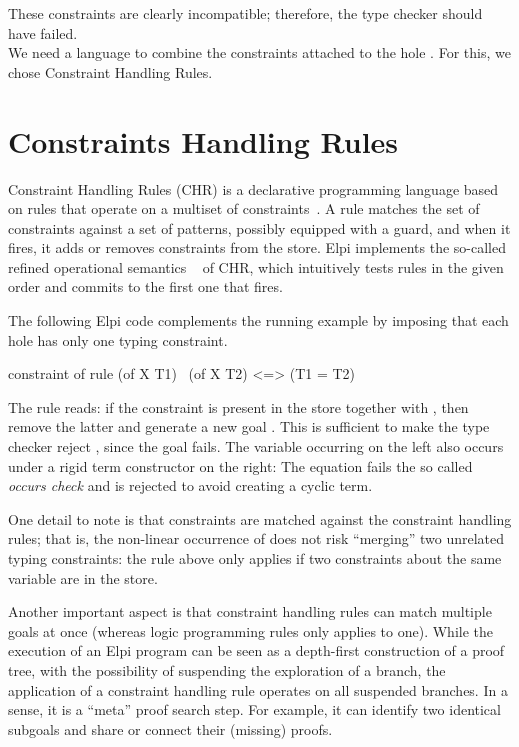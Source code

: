 \documentclass[a4paper, 11pt]{book}
\begin{document}
These constraints are clearly incompatible; therefore, the type checker
should have failed.
~\\

We need a language to combine the constraints attached to the hole
. For this, we chose Constraint Handling Rules.

\section{Constraints Handling Rules}\label{sec:chrui}


Constraint Handling Rules (CHR) is a declarative programming language based
on rules that operate on a multiset of constraints~\cite{chr}. A rule matches
the set of constraints against a set of patterns, possibly equipped with a
guard, and when it fires, it adds or removes constraints from the store.
Elpi implements the so-called refined operational semantics
~\cite{10.1007/978-3-540-27775-0_7} of CHR, which intuitively tests rules in
the given order and commits to the first one that fires.

The following Elpi code complements the running example by imposing that each
hole has only one typing constraint.

\begin{elpicode}
constraint of {
  rule (of X T1) \ (of X T2) <=> (T1 = T2)
}
\end{elpicode}


The rule reads: if the constraint  is present in the store
together with , then remove the latter and generate a new goal
. This is sufficient to make the type checker reject
, since the goal  fails.
The variable  occurring on the left also
occurs under a rigid term constructor  on the right:
The equation fails the so called \emph{occurs check} and is rejected
to avoid creating a cyclic term.

One detail to note is that constraints are matched against the constraint
handling rules; that is, the non-linear occurrence of  does not risk
``merging'' two unrelated typing constraints: the rule above only applies if two
constraints about the same variable are in the store.

Another important aspect is that constraint handling rules can match multiple
goals at once (whereas logic programming rules only applies to one). While
the execution of an Elpi program can be seen as a depth-first construction of
a proof tree, with the possibility of suspending the exploration of a branch,
the application of a constraint handling rule operates on all suspended
branches. In a sense, it is a ``meta'' proof search step. For example, it can
identify two identical subgoals and share or connect their (missing) proofs.
\end{document}
